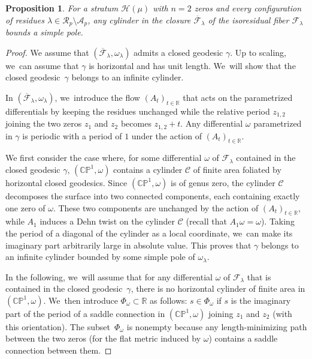 \documentclass[JEP,XML,SOM,Unicode,NoFloatCountersInSection,published]{cedram}
\newtheorem{prop}[thm]{Proposition}
\theoremstyle{definition}
\begin{document}
\begin{prop}\label{prop:cylinder}
For a stratum $\mathcal{H}(\mu)$ with $n=2$ zeros and every configuration of residues $\lambda \in \mathcal{R}_{p} \setminus \mathcal{A}_{p}$, any cylinder in the closure $\overline{\mathcal{F}}_{\lambda}$ of the isoresidual fiber $\mathcal{F}_{\lambda}$ bounds a simple pole.
\end{prop}

\begin{proof}
We assume that $(\overline{\mathcal{F}}_{\lambda},\omega_{\lambda})$ admits a closed geodesic $\gamma$. Up to scaling, we~can assume that $\gamma$ is horizontal and has unit length. We~will show that the closed geodesic~$\gamma$ belongs to an infinite cylinder.

In $(\overline{\mathcal{F}}_{\lambda},\omega_{\lambda})$, we~introduce the flow $(A_{t})_{t \in \mathbb{R}}$ that acts on the parametrized differentials by keeping the residues unchanged while the relative period $z_{1,2}$ joining the two zeros $z_1$ and $z_2$ becomes $z_{1,2}+t$. Any differential $\omega$ parametrized in $\gamma$ is periodic with a period of $1$ under the action of $(A_{t})_{t \in \mathbb{R}}$.

We first consider the case where, for some differential $\omega$ of $\mathcal{F}_{\lambda}$ contained in the closed geodesic $\gamma$, $(\mathbb{CP}^{1},\omega)$ contains a cylinder $\mathcal{C}$ of finite area foliated by horizontal closed geodesics. Since $(\mathbb{CP}^{1},\omega)$ is of genus zero, the cylinder $\mathcal{C}$ decomposes the surface into two connected components, each containing exactly one zero of $\omega$. These two components are unchanged by the action of $(A_{t})_{t \in \mathbb{R}}$, while $A_{1}$ induces a Dehn twist on the cylinder $\mathcal{C}$ (recall that $A_{1}\omega=\omega$). Taking the period of a diagonal of the cylinder as a local coordinate, we~can make its imaginary part arbitrarily large in absolute value. This proves that $\gamma$ belongs to an infinite cylinder bounded by some simple pole of $\omega_{\lambda}$.

In the following, we~will assume that for any differential $\omega$ of $\mathcal{F}_{\lambda}$ that is contained in the closed geodesic~$\gamma$, there is no horizontal cylinder of finite area in $(\mathbb{CP}^{1},\omega)$. We~then introduce $\Phi_{\omega} \subset \mathbb{R}$ as follows: $s \in \Phi_{\omega}$ if $s$ is the imaginary part of the period of a saddle connection in $(\mathbb{CP}^{1},\omega)$ joining $z_1$ and $z_2$ (with this orientation). The subset~$\Phi_{\omega}$ is nonempty because any length-minimizing path between the two zeros (for the flat metric induced by $\omega$) contains a saddle connection between them.


\end{proof}
\end{document}
